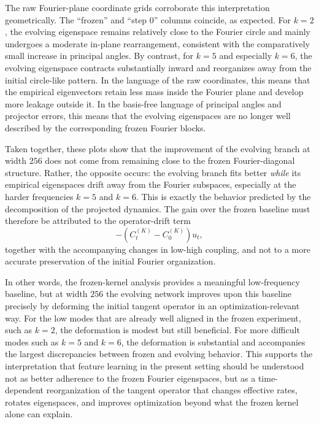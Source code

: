 \documentclass[11pt]{article}
\begin{document}
The raw Fourier-plane coordinate grids corroborate this interpretation geometrically. The ``frozen'' and ``step \(0\)'' columns coincide, as expected. For \(k=2\), the evolving eigenspace remains relatively close to the Fourier circle and mainly undergoes a moderate in-plane rearrangement, consistent with the comparatively small increase in principal angles. By contrast, for \(k=5\) and especially \(k=6\), the evolving eigenspace contracts substantially inward and reorganizes away from the initial circle-like pattern. In the language of the raw coordinates, this means that the empirical eigenvectors retain less mass inside the Fourier plane and develop more leakage outside it. In the basis-free language of principal angles and projector errors, this means that the evolving eigenspaces are no longer well described by the corresponding frozen Fourier blocks.

Taken together, these plots show that the improvement of the evolving branch at width \(256\) does not come from remaining close to the frozen Fourier-diagonal structure. Rather, the opposite occurs: the evolving branch fits better \emph{while} its empirical eigenspaces drift away from the Fourier subspaces, especially at the harder frequencies \(k=5\) and \(k=6\). This is exactly the behavior predicted by the decomposition of the projected dynamics. The gain over the frozen baseline must therefore be attributed to the operator-drift term
\[
	-(C_t^{(K)}-C_0^{(K)})u_t,
\]
together with the accompanying changes in low-high coupling, and not to a more accurate preservation of the initial Fourier organization.

In other words, the frozen-kernel analysis provides a meaningful low-frequency baseline, but at width \(256\) the evolving network improves upon this baseline precisely by deforming the initial tangent operator in an optimization-relevant way. For the low modes that are already well aligned in the frozen experiment, such as \(k=2\), the deformation is modest but still beneficial. For more difficult modes such as \(k=5\) and \(k=6\), the deformation is substantial and accompanies the largest discrepancies between frozen and evolving behavior. This supports the interpretation that feature learning in the present setting should be understood not as better adherence to the frozen Fourier eigenspaces, but as a time-dependent reorganization of the tangent operator that changes effective rates, rotates eigenspaces, and improves optimization beyond what the frozen kernel alone can explain.
\end{document}
